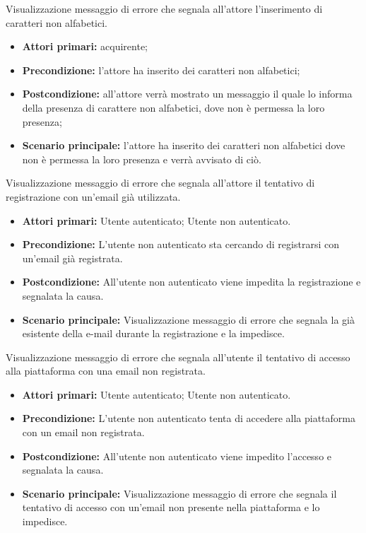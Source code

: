 Visualizzazione messaggio di errore che segnala all'attore l'inserimento di caratteri non alfabetici.
\begin{itemize}
    \item \textbf{Attori primari:} acquirente;
    \item \textbf{Precondizione:} l'attore ha inserito dei caratteri non alfabetici;
    \item \textbf{Postcondizione:} all'attore verrà mostrato un messaggio il quale lo informa della presenza di carattere non alfabetici, dove non è permessa la loro presenza;
    \item \textbf{Scenario principale:} l'attore ha inserito dei caratteri non alfabetici dove non è permessa la loro presenza e verrà avvisato di ciò.
\end{itemize}

Visualizzazione messaggio di errore che segnala all'attore il tentativo di registrazione con un'email già utilizzata.
\begin{itemize}
    \item \textbf{Attori primari:} Utente autenticato; Utente non autenticato.
    \item \textbf{Precondizione:} L'utente non autenticato sta cercando di registrarsi con un'email già registrata.
    \item \textbf{Postcondizione:} All'utente non autenticato viene impedita la registrazione e segnalata la causa.
    \item \textbf{Scenario principale:} Visualizzazione messaggio di errore che segnala la già esistente della e-mail durante la registrazione e la impedisce.
\end{itemize}

Visualizzazione messaggio di errore che segnala all'utente il tentativo di accesso alla piattaforma con una email non registrata.
\begin{itemize}
    \item \textbf{Attori primari:} Utente autenticato; Utente non autenticato.
    \item \textbf{Precondizione:} L'utente non autenticato tenta di accedere alla piattaforma con un email non registrata.
    \item \textbf{Postcondizione:} All'utente non autenticato viene impedito l'accesso e segnalata la causa.
    \item \textbf{Scenario principale:} Visualizzazione messaggio di errore che segnala il tentativo di accesso con un'email non presente nella piattaforma e lo impedisce.
\end{itemize}


